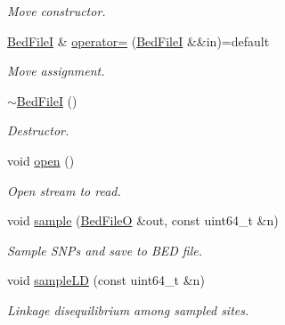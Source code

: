 \begin{DoxyCompactItemize}
\begin{DoxyCompactList}\small\item\em Move constructor. \end{DoxyCompactList}\item 
\mbox{\label{classvarfiles_1_1_bed_file_i_afab862c9ccdac2cd9f677695110bb72a}} 
\hyperlink{classvarfiles_1_1_bed_file_i}{Bed\+FileI} \& \hyperlink{classvarfiles_1_1_bed_file_i_afab862c9ccdac2cd9f677695110bb72a}{operator=} (\hyperlink{classvarfiles_1_1_bed_file_i}{Bed\+FileI} \&\&in)=default
\begin{DoxyCompactList}\small\item\em Move assignment. \end{DoxyCompactList}\item 
\mbox{\label{classvarfiles_1_1_bed_file_i_a1dc7dab19e5cbb96e744182a868caa5d}} 
\hyperlink{classvarfiles_1_1_bed_file_i_a1dc7dab19e5cbb96e744182a868caa5d}{$\sim$\+Bed\+FileI} ()
\begin{DoxyCompactList}\small\item\em Destructor. \end{DoxyCompactList}\item 
\mbox{\label{classvarfiles_1_1_bed_file_i_a36ff04242d3c4bd65c9f1d8be5153997}} 
void \hyperlink{classvarfiles_1_1_bed_file_i_a36ff04242d3c4bd65c9f1d8be5153997}{open} ()
\begin{DoxyCompactList}\small\item\em Open stream to read. \end{DoxyCompactList}\item 
void \hyperlink{classvarfiles_1_1_bed_file_i_ac1050b3b8aec9108ae05285cbdfd85b3}{sample} (\hyperlink{classvarfiles_1_1_bed_file_o}{Bed\+FileO} \&out, const uint64\+\_\+t \&n)
\begin{DoxyCompactList}\small\item\em Sample S\+N\+Ps and save to B\+ED file. \end{DoxyCompactList}\item 
void \hyperlink{classvarfiles_1_1_bed_file_i_ae502304386c409e9312a090a189ab694}{sample\+LD} (const uint64\+\_\+t \&n)
\begin{DoxyCompactList}\small\item\em Linkage disequilibrium among sampled sites. \end{DoxyCompactList}\item 

\end{DoxyCompactItemize}
